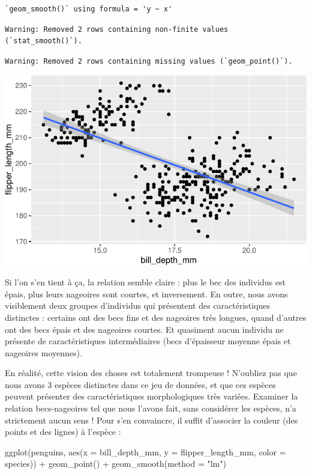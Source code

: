 \documentclass[
  a4paper,
  DIV=11,
  numbers=noendperiod,
  oneside]{scrreprt}
\newenvironment{Shaded}{}{}
\newcommand{\AttributeTok}[1]{\textcolor[rgb]{0.84,0.23,0.29}{#1}}
\newcommand{\FunctionTok}[1]{\textcolor[rgb]{0.44,0.26,0.76}{#1}}
\newcommand{\NormalTok}[1]{\textcolor[rgb]{0.14,0.16,0.18}{#1}}
\newcommand{\SpecialCharTok}[1]{\textcolor[rgb]{0.00,0.36,0.77}{#1}}
\newcommand{\StringTok}[1]{\textcolor[rgb]{0.01,0.18,0.38}{#1}}
\begin{document}
\begin{verbatim}
`geom_smooth()` using formula = 'y ~ x'
\end{verbatim}

\begin{verbatim}
Warning: Removed 2 rows containing non-finite values (`stat_smooth()`).
\end{verbatim}

\begin{verbatim}
Warning: Removed 2 rows containing missing values (`geom_point()`).
\end{verbatim}

\includegraphics{03-visualization_files/figure-pdf/unnamed-chunk-82-1.pdf}

Si l'on s'en tient à ça, la relation semble claire : plus le bec des
individus est épais, plus leurs nageoires sont courtes, et inversement.
En outre, nous avons visiblement deux groupes d'individus qui présentent
des caractéristiques distinctes : certains ont des becs fins et des
nageoires très longues, quand d'autres ont des becs épais et des
nageoires courtes. Et quasiment aucun individu ne présente de
caractéristiques intermédiaires (becs d'épaisseur moyenne épais et
nageoires moyennes).

En réalité, cette vision des choses est totalement trompeuse ! N'oubliez
pas que nous avons 3 espèces distinctes dans ce jeu de données, et que
ces espèces peuvent présenter des caractéristiques morphologiques très
variées. Examiner la relation becs-nageoires tel que nous l'avons fait,
sans considérer les espèces, n'a strictement aucun sens ! Pour s'en
convaincre, il suffit d'associer la couleur (des points et des lignes) à
l'espèce :

\begin{Shaded}
\begin{Highlighting}[]
\FunctionTok{ggplot}\NormalTok{(penguins, }\FunctionTok{aes}\NormalTok{(}\AttributeTok{x =}\NormalTok{ bill\_depth\_mm, }\AttributeTok{y =}\NormalTok{ flipper\_length\_mm,}
                     \AttributeTok{color =}\NormalTok{ species)) }\SpecialCharTok{+}
  \FunctionTok{geom\_point}\NormalTok{() }\SpecialCharTok{+}
  \FunctionTok{geom\_smooth}\NormalTok{(}\AttributeTok{method =} \StringTok{"lm"}\NormalTok{)}
\end{Highlighting}
\end{Shaded}
\end{document}
